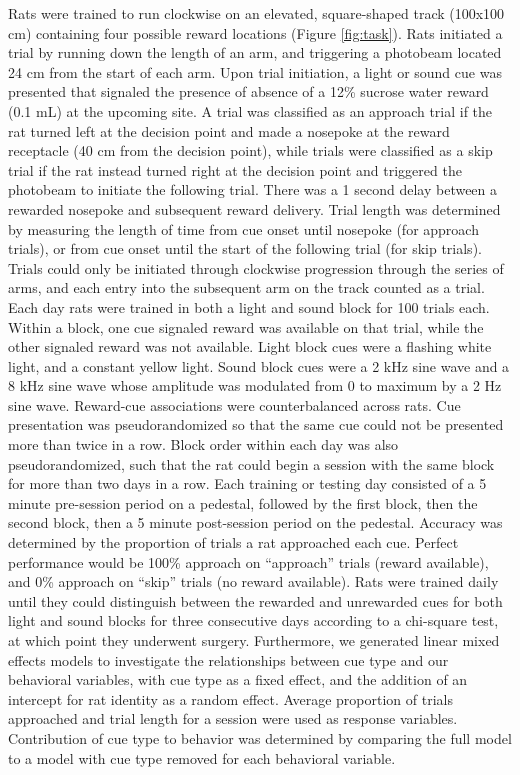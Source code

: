 \documentclass[11pt]{article}
\begin{document}
Rats were trained to run clockwise on an elevated, square-shaped track (100x100 cm) containing four possible reward locations (Figure \ref{fig:task}). Rats initiated a trial by running down the length of an arm, and triggering a photobeam located 24 cm from the start of each arm. Upon trial initiation, a light or sound cue was presented that signaled the presence of absence of a 12\% sucrose water reward (0.1 mL) at the upcoming site. A trial was classified as an approach trial if the rat turned left at the decision point and made a nosepoke at the reward receptacle (40 cm from the decision point), while trials were classified as a skip trial if the rat instead turned right at the decision point and triggered the photobeam to initiate the following trial. There was a 1 second delay between a rewarded nosepoke and subsequent reward delivery. Trial length was determined by measuring the length of time from cue onset until nosepoke (for approach trials), or from cue onset until the start of the following trial (for skip trials). Trials could only be initiated through clockwise progression through the series of arms, and each entry into the subsequent arm on the track counted as a trial. Each day rats were trained in both a light and sound block for 100 trials each. Within a block, one cue signaled reward was available on that trial, while the other signaled reward was not available. Light block cues were a flashing white light, and a constant yellow light. Sound block cues were a 2 kHz sine wave and a 8 kHz sine wave whose amplitude was modulated from 0 to maximum by a 2 Hz sine wave. Reward-cue associations were counterbalanced across rats. Cue presentation was pseudorandomized so that the same cue could not be presented more than twice in a row. Block order within each day was also pseudorandomized, such that the rat could begin a session with the same block for more than two days in a row. Each training or testing day consisted of a 5 minute pre-session period on a pedestal, followed by the first block, then the second block, then a 5 minute post-session period on the pedestal. Accuracy was determined by the proportion of trials a rat approached each cue. Perfect performance would be 100\% approach on “approach” trials (reward available), and 0\% approach on “skip” trials (no reward available). Rats were trained daily until they could distinguish between the rewarded and unrewarded cues for both light and sound blocks for three consecutive days according to a chi-square test, at which point they underwent surgery. Furthermore, we generated linear mixed effects models to investigate the relationships between cue type and our behavioral variables, with cue type as a fixed effect, and the addition of an intercept for rat identity as a random effect. Average proportion of trials approached and trial length for a session were used as response variables. Contribution of cue type to behavior was determined by comparing the full model to a model with cue type removed for each behavioral variable. 
\end{document}
